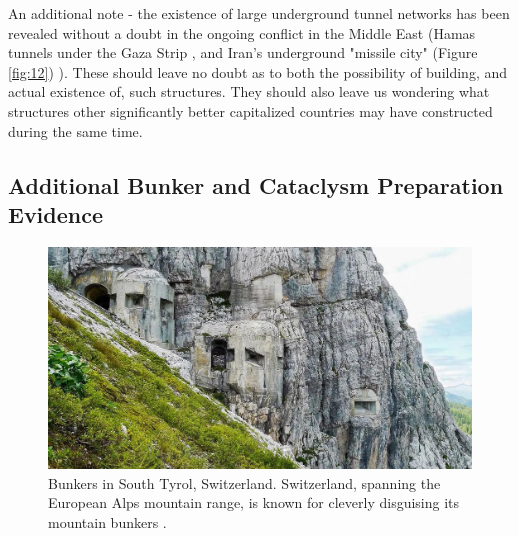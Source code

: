 \documentclass[10pt,twocolumn,letterpaper]{article}
\begin{document}
An additional note - the existence of large underground tunnel networks has been revealed without a doubt in the ongoing conflict in the Middle East (Hamas tunnels under the Gaza Strip \cite{38}, and Iran's underground "missile city" (Figure \ref{fig:12}) \cite{39,40}). These should leave no doubt as to both the possibility of building, and actual existence of, such structures. They should also leave us wondering what structures other significantly better capitalized countries may have constructed during the same time.

\subsection{Additional Bunker and Cataclysm Preparation Evidence}

\begin{figure}[t]
\begin{center}
   \includegraphics[width=1\linewidth]{tyrol.jpg}
\end{center}
   \caption{Bunkers in South Tyrol, Switzerland. Switzerland, spanning the European Alps mountain range, is known for cleverly disguising its mountain bunkers \cite{32}.}
\label{fig:7}
\label{fig:onecol}
\end{figure}
\end{document}
